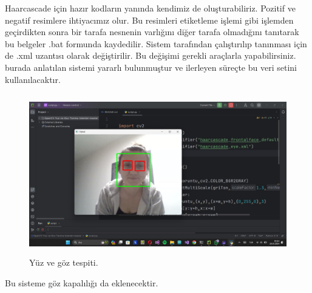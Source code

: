 \documentclass[12pt, a4paper]{article}
\begin{document}
	Haarcascade için hazır kodların yanında kendimiz de oluşturabiliriz. Pozitif ve negatif resimlere ihtiyacımız olur. Bu resimleri etiketleme işlemi gibi işlemden geçirdikten sonra bir tarafa nesnenin varlığını diğer tarafa olmadığını tanıtarak bu belgeler .bat formunda kaydedilir. Sistem tarafından çalıştırılıp tanınması için de .xml uzantısı olarak değiştirilir. Bu değişimi gerekli araçlarla yapabilirsiniz. \cite{dasar_haartrain} burada anlatılan sistemi yararlı bulunmuştur ve ilerleyen süreçte bu veri setini kullanılacaktır.\clearpage
	\begin{figure}
		\centering
		\includegraphics[width=17cm, height=7cm, keepaspectratio]{yuzgoztanima.jpg}
		\caption{Yüz ve göz tespiti.} 
	\end{figure}
	\par
	Bu sisteme göz kapalılığı da eklenecektir.\\ 
\end{document}
